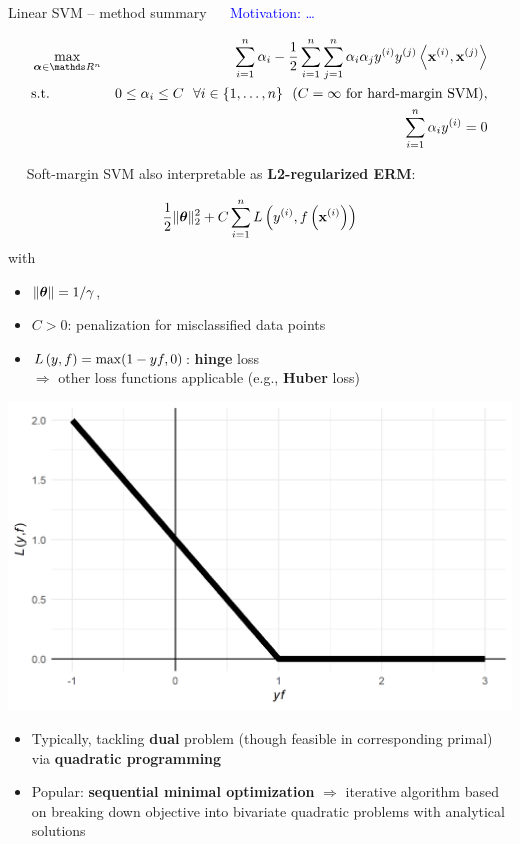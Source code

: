 \begin{vbframe}{Linear SVM -- method summary}
 ~~ %
\textcolor{blue}{Motivation: \dots}

\begin{eqnarray*}
    & \max\limits_{\alphav \in \R^n} & \dualobj \\
    & \text{s.t. } & 0 \le \alpha_i \le C ~~ \forall i \in \nset ~~ (C = \infty
    \text{ for hard-margin SVM)}, \\
    & \quad & \sum_{i=1}^n \alpha_i \yi = 0
\end{eqnarray*}

\medskip

 ~~ Soft-margin SVM also interpretable as 
\textbf{L2-regularized ERM}: 

\begin{minipage}[b]{0.58\textwidth}
  $$ \frac{1}{2} \|\bm{\theta}\|_2^2 + C \sum\limits_{i=1}^n L\left(y^{(i)}, f\left(\mathbf{x}^{(i)}\right)\right)$$ 
  with  
  \begin{itemize}
    \item $\|\bm{\theta}\| = 1 / \gamma$,\\
    \item $C > 0$: penalization for misclassified data points
    \item $L\left(y, f\right) = \max(1-yf, 0)$: \textbf{hinge} loss \\
    $\Rightarrow$ other loss functions applicable (e.g., \textbf{Huber} loss)
  \end{itemize}
\end{minipage}
\begin{minipage}[b]{0.4\textwidth}
  \centering
  \includegraphics[height=0.4\textwidth, keepaspectratio=true]{
  figure/plot-hinge-loss.png}
\end{minipage}

\framebreak


\begin{itemize}
  \item Typically, tackling \textbf{dual} problem (though feasible 
  in corresponding primal) via \textbf{quadratic programming}
  \item Popular: \textbf{sequential minimal optimization} $\Rightarrow$ 
  iterative algorithm based on breaking down objective into bivariate quadratic 
  problems with analytical solutions
\end{itemize}
\medskip


\end{vbframe}
